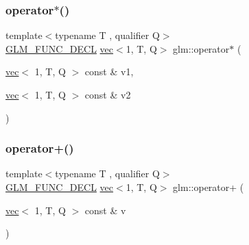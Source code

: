 \subsubsection{\texorpdfstring{operator$\ast$()}{operator*()}\hspace{0.1cm}{\footnotesize\ttfamily [3/3]}}
{\footnotesize\ttfamily template$<$typename T , qualifier Q$>$ \\
\mbox{\hyperlink{setup_8hpp_ab2d052de21a70539923e9bcbf6e83a51}{G\+L\+M\+\_\+\+F\+U\+N\+C\+\_\+\+D\+E\+CL}} \mbox{\hyperlink{structglm_1_1vec}{vec}}$<$1, T, Q$>$ glm\+::operator$\ast$ (\begin{DoxyParamCaption}\item[{\mbox{\hyperlink{structglm_1_1vec}{vec}}$<$ 1, T, Q $>$ const \&}]{v1,  }\item[{\mbox{\hyperlink{structglm_1_1vec}{vec}}$<$ 1, T, Q $>$ const \&}]{v2 }\end{DoxyParamCaption})}

\mbox{\label{group__ext__vec1_gac2cf4da0dc267f31db88de168ea3169b}} 
\subsubsection{\texorpdfstring{operator+()}{operator+()}\hspace{0.1cm}{\footnotesize\ttfamily [1/4]}}
{\footnotesize\ttfamily template$<$typename T , qualifier Q$>$ \\
\mbox{\hyperlink{setup_8hpp_ab2d052de21a70539923e9bcbf6e83a51}{G\+L\+M\+\_\+\+F\+U\+N\+C\+\_\+\+D\+E\+CL}} \mbox{\hyperlink{structglm_1_1vec}{vec}}$<$1, T, Q$>$ glm\+::operator+ (\begin{DoxyParamCaption}\item[{\mbox{\hyperlink{structglm_1_1vec}{vec}}$<$ 1, T, Q $>$ const \&}]{v }\end{DoxyParamCaption})}

\mbox{\label{group__ext__vec1_ga00b4b51068bde0730a3ed9ebeb254a24}} 
